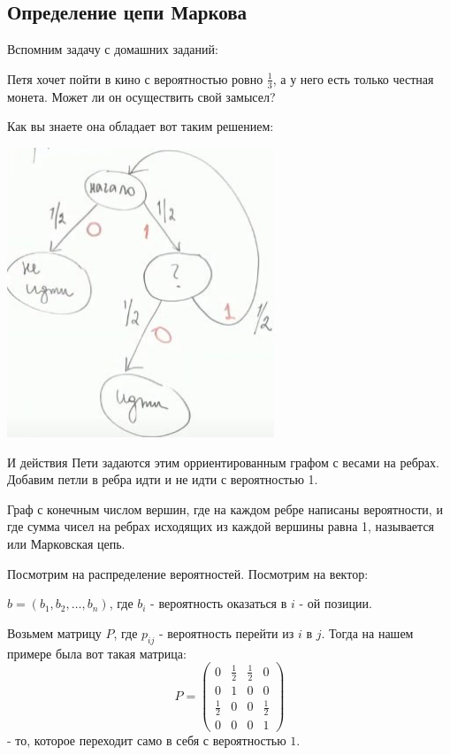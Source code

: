 \subsection{Определение цепи Маркова}

Вспомним задачу с домашних заданий:

Петя хочет пойти в кино с вероятностью ровно $\frac{1}{3}$, а у него есть только честная монета. Может ли он осуществить свой замысел?

Как вы знаете она обладает вот таким решением:

\begin{center}
   \includegraphics[width=8cm]{assets/5_1_1.jpg}
\end{center}

И действия Пети задаются этим орриентированным графом с весами на ребрах. Добавим петли в ребра идти и не идти с вероятностью 1.

Граф с конечным числом вершин, где на каждом ребре написаны вероятности, и где сумма чисел на ребрах исходящих из каждой вершины равна 1, называется  или Марковская цепь. 

Посмотрим на распределение вероятностей. Посмотрим на вектор:

$b = (b_1,b_2,\ldots,b_n)$, где $b_i$ - вероятность оказаться в $i$ - ой позиции.

Возьмем матрицу $P$, где $p_{ij}$ - вероятность перейти из $i$ в $j$. Тогда на нашем примере была вот такая матрица:
$$P = \begin{pmatrix}
0&\frac{1}{2}&\frac{1}{2} & 0 \\
0& 1&0&0\\
\frac{1}{2}&0&0&\frac{1}{2}\\
0&0&0&1
\end{pmatrix}
$$
 - то, которое переходит само в себя с вероятностью $1$.

